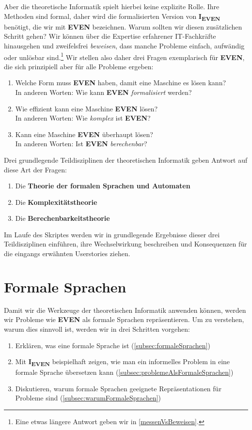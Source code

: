 Aber die theoretische Informatik spielt hierbei keine explizite Rolle.
Ihre Methoden sind formal,
daher wird die formalisierten Version von \textbf{I\textsubscript{EVEN}} benötigt,
die wir mit \textbf{EVEN} bezeichnen.
Warum sollten wir diesen zusätzlichen Schritt gehen?
Wir können über die Expertise erfahrener IT-Fachkräfte hinausgehen
und zweifelsfrei \emph{beweisen},
dass manche Probleme einfach, aufwändig oder unlösbar sind.\footnote{
    Eine etwas längere Antwort geben wir in \autoref{messenVsBeweisen}.
}
Wir stellen also daher drei Fragen exemplarisch für \textbf{EVEN},
die sich prinzipiell aber für alle Probleme ergeben:
\begin{enumerate}
    \item Welche Form muss \textbf{EVEN} haben, damit eine Maschine es lösen kann?\\ 
        In anderen Worten: Wie kann \textbf{EVEN} \emph{formalisiert} werden? 
    \item Wie effizient kann eine Maschine \textbf{EVEN} lösen?\\
        In anderen Worten: Wie \emph{komplex} ist \textbf{EVEN}?
    \item Kann eine Maschine \textbf{EVEN} überhaupt lösen?\\
        In anderen Worten: Ist \textbf{EVEN} \emph{berechenbar}?  
\end{enumerate}
Drei grundlegende Teildisziplinen der theoretischen Informatik
geben Antwort auf diese Art der Fragen:
\begin{enumerate}
    \item Die \textbf{Theorie der formalen Sprachen und Automaten}
    \item Die \textbf{Komplexitätstheorie}
    \item Die \textbf{Berechenbarkeitstheorie}
\end{enumerate}
Im Laufe des Skriptes werden wir
in grundlegende Ergebnisse dieser drei Teildisziplinen einführen,
ihre Wechselwirkung beschreiben
und Konsequenzen für die eingangs erwähnten Userstories ziehen.

\section{Formale Sprachen}\label{sec:formalisierung}

Damit wir die Werkzeuge der theoretischen Informatik anwenden können,
werden wir Probleme wie \textbf{EVEN} als formale Sprachen repräsentieren.
Um zu verstehen, warum dies sinnvoll ist,
werden wir in drei Schritten vorgehen:
\begin{enumerate}
    \item Erklären, was eine formale Sprache ist (\autoref{subsec:formaleSprachen})
    \item Mit \textbf{I\textsubscript{EVEN}} beispielhaft zeigen,
        wie man ein informelles Problem in eine formale Sprache übersetzen kann 
        (\autoref{subsec:problemeAlsFormaleSprachen})
    \item Diskutieren, warum formale Sprachen geeignete Repräsentationen für Probleme sind
        (\autoref{subsec:warumFormaleSprachen})
\end{enumerate}

